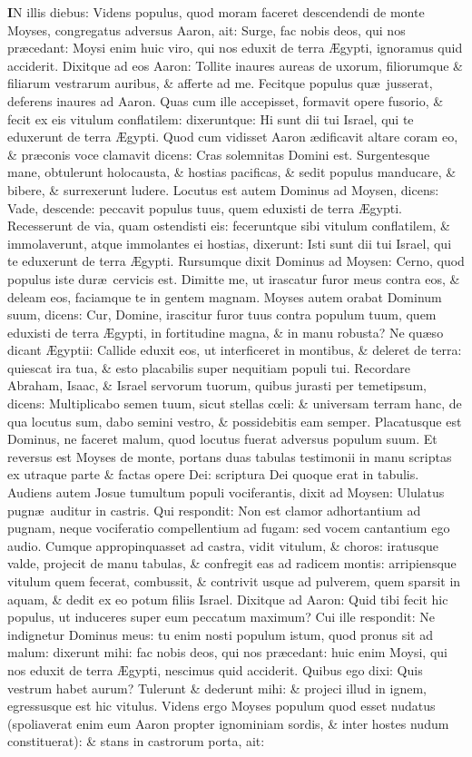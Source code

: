 \documentclass[letter,11pt]{book}
\begin{document}
\begin{multicols*}{2}
\lettrine[lines=2]{\bfseries \color{Red} I}{}N illis diebus: Videns populus, quod moram faceret descendendi de monte Moyses, congregatus adversus Aaron, ait: Surge, fac nobis deos, qui nos pr\ae cedant: Moysi enim huic viro, qui nos eduxit de terra \AE gypti, ignoramus quid acciderit. Dixitque ad eos Aaron: Tollite inaures aureas de uxorum, filiorumque \& filiarum vestrarum auribus, \& afferte ad me. Fecitque populus qu\ae \ jusserat, deferens inaures ad Aaron. Quas cum ille accepisset, formavit opere fusorio, \& fecit ex eis vitulum conflatilem: dixeruntque: Hi sunt dii tui Israel, qui te eduxerunt de terra \AE gypti. Quod cum vidisset Aaron \ae dificavit altare coram eo, \& pr\ae conis voce clamavit dicens: Cras solemnitas Domini est. Surgentesque mane, obtulerunt holocausta, \& hostias pacificas, \& sedit populus manducare, \& bibere, \& surrexerunt ludere. Locutus est autem Dominus ad Moysen, dicens: Vade, descende: peccavit populus tuus, quem eduxisti de terra \AE gypti. Recesserunt de via, quam ostendisti eis: feceruntque sibi vitulum conflatilem, \& immolaverunt, atque immolantes ei hostias, dixerunt: Isti sunt dii tui Israel, qui te eduxerunt de terra \AE gypti. Rursumque dixit Dominus ad Moysen: Cerno, quod populus iste dur\ae \ cervicis est. Dimitte me, ut irascatur furor meus contra eos, \& deleam eos, faciamque te in gentem magnam. Moyses autem orabat Dominum suum, dicens: Cur, Domine, irascitur furor tuus contra populum tuum, quem eduxisti de terra \AE gypti, in fortitudine magna, \& in manu robusta? Ne qu\ae so dicant \AE gyptii: Callide eduxit eos, ut interficeret in montibus, \& deleret de terra: quiescat ira tua, \& esto placabilis super nequitiam populi tui. Recordare Abraham, Isaac, \& Israel servorum tuorum, quibus jurasti per temetipsum, dicens: Multiplicabo semen tuum, sicut stellas c\oe li: \& universam terram hanc, de qua locutus sum, dabo semini vestro, \& possidebitis eam semper. Placatusque est Dominus, ne faceret malum, quod locutus fuerat adversus populum suum. Et reversus est Moyses de monte, portans duas tabulas testimonii in manu scriptas ex utraque parte \& factas opere Dei: scriptura Dei quoque erat in tabulis. Audiens autem Josue tumultum populi vociferantis, dixit ad Moysen: Ululatus pugn\ae \ auditur in castris. Qui respondit: Non est clamor adhortantium ad pugnam, neque vociferatio compellentium ad fugam: sed vocem cantantium ego audio. Cumque appropinquasset ad castra, vidit vitulum, \& choros: iratusque valde, projecit de manu tabulas, \& confregit eas ad radicem montis: arripiensque vitulum quem fecerat, combussit, \& contrivit usque ad pulverem, quem sparsit in aquam, \& dedit ex eo potum filiis Israel. Dixitque ad Aaron: Quid tibi fecit hic populus, ut induceres super eum peccatum maximum? Cui ille respondit: Ne indignetur Dominus meus: tu enim nosti populum istum, quod pronus sit ad malum: dixerunt mihi: fac nobis deos, qui nos pr\ae cedant: huic enim Moysi, qui nos eduxit de terra \AE gypti, nescimus quid acciderit. Quibus ego dixi: Quis vestrum habet aurum? Tulerunt \& dederunt mihi: \& projeci illud in ignem, egressusque est hic vitulus. Videns ergo Moyses populum quod esset nudatus (spoliaverat enim eum Aaron propter ignominiam sordis, \& inter hostes nudum constituerat): \& stans in castrorum porta, ait: 
\end{multicols*}
\end{document}
